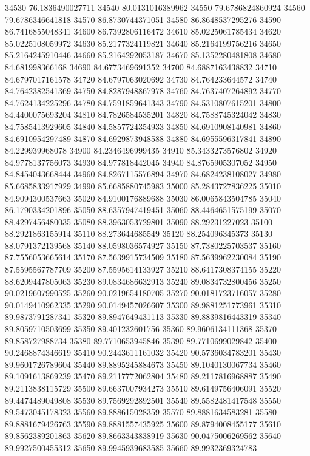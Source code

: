 {34530 76.1836490027711
34540 80.0131016389962
34550 79.6786824860924
34560 79.6786346641818
34570 86.8730744371051
34580 86.8648537295276
34590 86.7416855048341
34600 86.7392806116472
34610 85.0225061785434
34620 85.0225108059972
34630 85.2177324119821
34640 85.2164199756216
34650 85.2164245910446
34660 85.2164292053187
34670 85.1352280481808
34680 84.681998366168
34690 84.6773469691352
34700 84.6887163438832
34710 84.6797017161578
34720 84.6797063020692
34730 84.764233644572
34740 84.7642382541369
34750 84.8287948867978
34760 84.7637407264892
34770 84.7624134225296
34780 84.7591859641343
34790 84.5310807615201
34800 84.4400075693204
34810 84.7826584535201
34820 84.7588745324042
34830 84.7585413929605
34840 84.5857724354933
34850 84.6910908140981
34860 84.6910954297489
34870 84.6929873948588
34880 84.6955596317841
34890 84.229939968078
34900 84.2346496999435
34910 85.3433273576802
34920 84.9778137756073
34930 84.977818442045
34940 84.8765905307052
34950 84.8454043668444
34960 84.8267115576894
34970 84.6824238108027
34980 85.6685833917929
34990 85.6685880745983
35000 85.2843727836225
35010 84.9094300537663
35020 84.9100176889688
35030 86.0065843504785
35040 86.1790334201896
35050 88.6357947419451
35060 88.4464651575199
35070 88.4297456480035
35080 88.3963053729801
35090 88.29231227023
35100 88.2921863155914
35110 88.273644685549
35120 88.254096345373
35130 88.0791372139568
35140 88.0598036574927
35150 87.7380225703537
35160 87.7556053665614
35170 87.5639915734509
35180 87.5639962230084
35190 87.5595567787709
35200 87.5595614133927
35210 88.6417308374155
35220 88.6209447805063
35230 89.0834686632913
35240 89.0834732800456
35250 90.0219607990525
35260 90.0219654180705
35270 90.0181723716057
35280 90.0149410962335
35290 90.0149457026607
35300 89.9881251773961
35310 89.9873791287341
35320 89.8947649431113
35330 89.8839816443319
35340 89.8059710503699
35350 89.401232601756
35360 89.9606134111368
35370 89.858727988734
35380 89.7710653945846
35390 89.7710699029842
35400 90.2468874346619
35410 90.2443611161032
35420 90.5736034783201
35430 89.9601726789604
35440 89.8895245884673
35450 89.1040130067734
35460 89.1091613869239
35470 89.2117772062804
35480 89.2117816968887
35490 89.2113838115729
35500 89.6637007934273
35510 89.6149756406091
35520 89.4474489049808
35530 89.7569292892501
35540 89.5582481417548
35550 89.5473045178323
35560 89.888615028359
35570 89.8881634583281
35580 89.8881679426763
35590 89.8881557435925
35600 89.8794008455177
35610 89.8562389201863
35620 89.8663343838919
35630 90.0475006269562
35640 89.9927500455312
35650 89.9945939683585
35660 89.9932369324783
}
